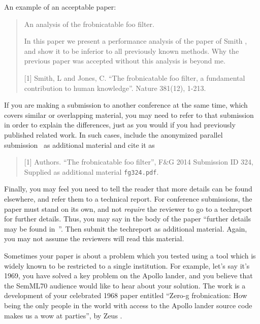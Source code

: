 \documentclass[10pt,twocolumn,letterpaper]{article}
\begin{document}
An example of an acceptable paper:

\begin{quote}
\begin{center}
     An analysis of the frobnicatable foo filter.
\end{center}

   In this paper we present a performance analysis of the
   paper of Smith \etal [1], and show it to be inferior to
   all previously known methods.  Why the previous paper
   was accepted without this analysis is beyond me.

   [1] Smith, L and Jones, C. ``The frobnicatable foo
   filter, a fundamental contribution to human knowledge''.
   Nature 381(12), 1-213.
\end{quote}

If you are making a submission to another conference at the same time,
which covers similar or overlapping material, you may need to refer to that
submission in order to explain the differences, just as you would if you
had previously published related work.  In such cases, include the
anonymized parallel submission~\cite{Authors14} as additional material and
cite it as
\begin{quote}
[1] Authors. ``The frobnicatable foo filter'', F\&G 2014 Submission ID 324,
Supplied as additional material {\tt fg324.pdf}.
\end{quote}

Finally, you may feel you need to tell the reader that more details can be
found elsewhere, and refer them to a technical report.  For conference
submissions, the paper must stand on its own, and not {\em require} the
reviewer to go to a techreport for further details.  Thus, you may say in
the body of the paper ``further details may be found
in~\cite{Authors14b}''.  Then submit the techreport as additional material.
Again, you may not assume the reviewers will read this material.

Sometimes your paper is about a problem which you tested using a tool which
is widely known to be restricted to a single institution.  For example,
let's say it's 1969, you have solved a key problem on the Apollo lander,
and you believe that the SemML70 audience would like to hear about your
solution.  The work is a development of your celebrated 1968 paper entitled
``Zero-g frobnication: How being the only people in the world with access to
the Apollo lander source code makes us a wow at parties'', by Zeus \etal.
\end{document}
